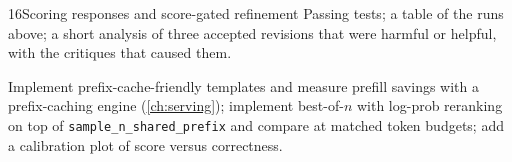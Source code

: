 \begin{labbox}{16}{Scoring responses and score-gated refinement}
Passing tests; a table of the runs above; a short analysis of three accepted revisions that were
harmful or helpful, with the critiques that caused them.

Implement prefix-cache-friendly templates and measure prefill savings with a prefix-caching engine
(\cref{ch:serving}); implement best-of-$n$ with log-prob reranking on top of
\texttt{sample\_n\_shared\_prefix} and compare at matched token budgets; add a calibration plot of
score versus correctness.
\end{labbox}
